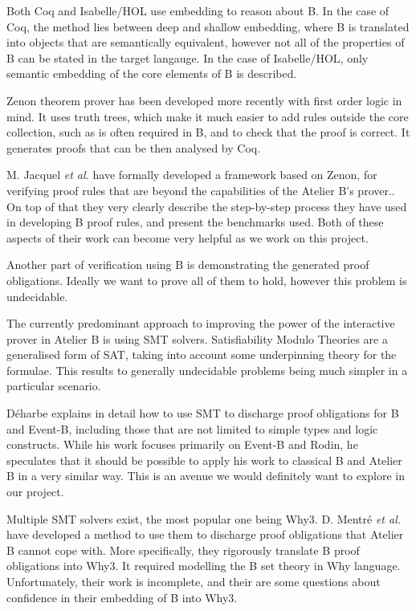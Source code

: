 \documentclass[11pt,journal]{IEEEtran}
\begin{document}
	Both Coq and Isabelle/HOL use embedding to reason about B. In the case of Coq, the method lies between deep and shallow embedding, where B is translated into objects that are semantically equivalent, however not all of the properties of B can be stated in the target langauge\cite{Coq and PVS}. In the case of Isabelle/HOL, only semantic embedding of the core elements of B is described.
	
	Zenon theorem prover has been developed more recently with first order logic in mind.\cite{Zenon} It uses truth trees, which make it much easier to add rules outside the core collection, such as is often required in B, and to check that the proof is correct. It generates proofs that can be then analysed by Coq.
	
	M. Jacquel \emph{et al.} have formally developed a framework based on Zenon, for verifying proof rules that are beyond the capabilities of the Atelier B's prover.\cite{embedding and theorem proving}. On top of that they very clearly describe the step-by-step process they have used in developing B proof rules, and present the benchmarks used. Both of these aspects of their work can become very helpful as we work on this project.
	
	Another part of verification using B is demonstrating the generated proof obligations. Ideally we want to prove all of them to hold, however this problem is undecidable.
	
	The currently predominant approach to improving the power of the interactive prover in Atelier B is using SMT solvers. Satisfiability Modulo Theories are a generalised form of SAT, taking into account some underpinning theory for the formulae. This results to generally undecidable problems being much simpler in a particular scenario.\cite{SMT handbook}
	
	D\'{e}harbe explains in detail how to use SMT to discharge proof obligations for B and Event-B, including those that are not limited to simple types and logic constructs. While his work focuses primarily on Event-B and Rodin, he speculates that it should be possible to apply his work to classical B and Atelier B in a very similar way.\cite{SMT} This is an avenue we would definitely want to explore in our project.
	
	Multiple SMT solvers exist, the most popular one being Why3. D. Mentr\'{e} \emph{et al.} have developed a method to use them to discharge proof obligations that Atelier B cannot cope with. More specifically, they rigorously translate B proof obligations into Why3. It required modelling the B set theory in Why language. Unfortunately, their work is incomplete, and their are some questions about confidence in their embedding of B into Why3.
	
\end{document}
